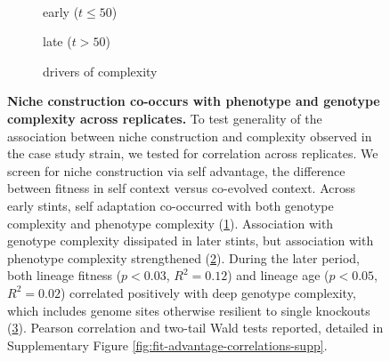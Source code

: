 \begin{figure}
\vspace{-1.75ex}

\begin{minipage}{\linewidth}%
    \begin{minipage}{0.01\linewidth}
        ~
    \end{minipage}
    \begin{subfigure}[t]{0.26\linewidth}
      \caption{early ($t\leq50$)}
      \label{fig:fit-advantage-correlations:early}
    \end{subfigure}%
    \begin{subfigure}[t]{0.26\linewidth}
      \caption{late ($t>50$)}
      \label{fig:fit-advantage-correlations:late}
    \end{subfigure}%
    \begin{subfigure}[t]{0.46\linewidth}
    \caption{drivers of complexity}
    \label{fig:fit-advantage-correlations:complexity-drivers}
    \end{subfigure}
\end{minipage}

\vspace{-1ex}

\caption{
\textbf{Niche construction co-occurs with phenotype and genotype complexity across replicates.}
\footnotesize
To test generality of the association between niche construction and complexity observed in the case study strain, we tested for correlation across replicates.
We screen for niche construction via self advantage, the difference between fitness in self context versus co-evolved context.
Across early stints, self adaptation co-occurred with both genotype complexity and phenotype complexity (\ref{fig:fit-advantage-correlations:early}).
Association with genotype complexity dissipated in later stints, but association with phenotype complexity strengthened (\ref{fig:fit-advantage-correlations:late}).
During the later period, both lineage fitness ($p < 0.03$, $R^2 = 0.12$) and lineage age ($p < 0.05$, $R^2 = 0.02$) correlated positively with deep genotype complexity, which includes genome sites otherwise resilient to single knockouts (\ref{fig:fit-advantage-correlations:complexity-drivers}).
Pearson correlation and two-tail Wald tests reported, detailed in Supplementary Figure \ref{fig:fit-advantage-correlations-supp}.
}
\label{fig:fit-advantage-correlations}

\end{figure}
